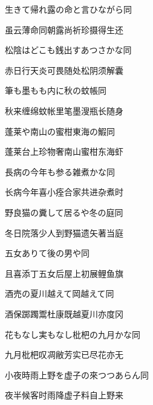 \begin{haiku}
    {\FH 生きて帰れ露の命と言ひながら}\hfill{\FH 同}

    {\FK 虽云薄命同朝露尚祈珍摄得生还}
\end{haiku}

\begin{haiku}
    {\FH 松陰はどこも銭出すあつさかな}\hfill{\FH 同}

    {\FK 赤日行天炎可畏随处松阴须解囊}
\end{haiku}

\begin{haiku}
    {\FH 筆も墨もも内に秋の蚊帳}\hfill{\FH 同}

    {\FK 秋来缠绵蚊帐里笔墨溲瓶长随身}
\end{haiku}

\begin{haiku}
    {\FH 蓬莱や南山の蜜柑東海の鰕}\hfill{\FH 同}

    {\FK 蓬莱台上珍物奢南山蜜柑东海虾}
\end{haiku}

\begin{haiku}
    {\FH 長病の今年も参る雑煮かな}\hfill{\FH 同}

    {\FK 长病今年喜小痊合家共进杂煮时}
\end{haiku}

\begin{haiku}
    {\FH 野良猫の糞して居るや冬の庭}\hfill{\FH 同}

    {\FK 冬日院落少人到野猫遗矢著当庭}
\end{haiku}

\begin{haiku}
    {\FH 五女ありて後の男や}\hfill{\FH 同}

    {\FK 且喜添丁五女后屋上初展鲤鱼旗}
\end{haiku}

\begin{haiku}
    {\FH 酒売の夏川越えて岡越えて}\hfill{\FH 同}

    {\FK 酒保踯躅鬻杜康既越夏川亦度冈}
\end{haiku}

\begin{haiku}
    {\FH 花もなし実もなし枇杷の九月かな}\hfill{\FH 同}

    {\FK 九月枇杷叹凋敝芳实已尽花亦无}
\end{haiku}

\begin{haiku}
    {\FH 小夜時雨上野を虚子の來つつあらん}\hfill{\FH 同}

    {\FK 夜半候客时雨降虚子料自上野来}
\end{haiku}

